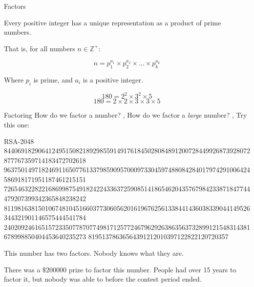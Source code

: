 \begin{namedframe}{Factors}
	\begin{theorem}
		Every positive integer has a unique representation as a product of prime numbers.

		That is, for all numbers $n \in \mathbb{Z}^+$:
		
		\[n = p_1^{a_1} \times p_2^{a_2} \times \dots \times p_k^{a_k}\]

		Where $p_i$ is prime, and $a_i$ is a positive integer.
	\end{theorem}
	\pause
	\begin{example}[180]
		\[180 = 2^2 \times 3^2 \times 5\]
		\[180 = 2 \times 2 \times 3 \times 3 \times 5\]
	\end{example}
\end{namedframe}
\begin{namedframe}{Factoring}
	How do we factor a number?
	\sep
	How do we factor a \emph{large} number?
	\sep
	Try this one:
	\begin{block}{RSA-2048}
		\tiny
		844069182906412495150821892985591491761845028084891200728449926873928072877767359714183472702618
		963750149718246911650776133798590957000973304597488084284017974291006424586918171951187461215151
		726546322822168699875491824224336372590851418654620435767984233871847744479207399342365848238242
		811981638150106748104516603773060562016196762561338441436038339044149526344321901146575444541784
		240209246165157233507787077498171257724679629263863563732899121548314381678998850404453640235273
		81951378636564391212010397122822120720357
	\end{block}
	\pause
	This number has two factors. Nobody knows what they are.

	There was a $\$\num{200000}$ prize to factor this number.
	People had over 15 years to factor it, but nobody was able to before the contest period ended.
\end{namedframe}
